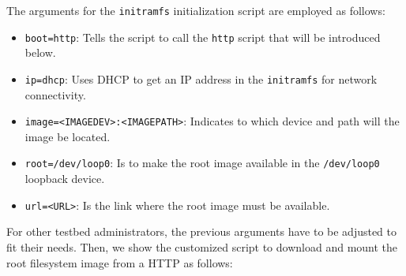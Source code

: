 
The arguments for the \texttt{initramfs} initialization script are employed
as follows:
\begin{itemize}
    \item \texttt{boot=http}: Tells the script to call the \texttt{http}
    script that will be introduced below.
    \item \texttt{ip=dhcp}: Uses \ac{DHCP} to get an \ac{IP} address in
    the \texttt{initramfs} for network connectivity.
    \item \texttt{image=<IMAGEDEV>:<IMAGEPATH>}: Indicates to which device
    and path will the image be located.
    \item \texttt{root=/dev/loop0}: Is to make the root image available in
    the \texttt{/dev/loop0} loopback device.
    \item \texttt{url=<URL>}: Is the link where the root image must be
    available.
\end{itemize}


For other testbed administrators, the previous arguments have to be adjusted
to fit their needs. Then, we show the customized script to download and
mount the root filesystem image from a \ac{HTTP} as follows:


